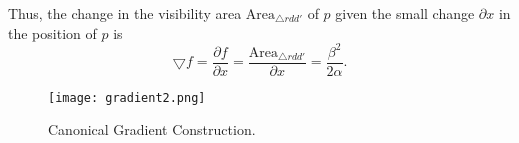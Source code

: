 Thus, the change in the visibility area $\text{Area}_{\triangle rdd'}$ of $p$ given the small change $\partial x$ in the position of $p$ is $$\bigtriangledown f = \frac{\partial f}{\partial x} = \frac{\text{Area}_{\triangle rdd'}}{\partial x} = \frac{\beta^2}{2\alpha}.$$


    

    


\begin{figure}[h!]
    \centering
    \texttt{[image: gradient2.png]}
    \caption{Canonical Gradient Construction.}
    \label{fig:gradient}
\end{figure}





